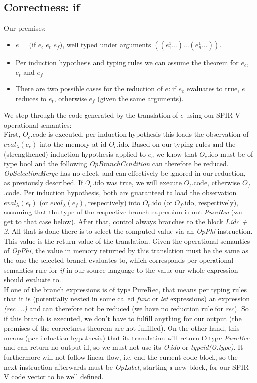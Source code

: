 \documentclass[letterpaper,12pt]{article}
\begin{document}
\subsection{Correctness: if}

Our premises:
\begin{itemize}
	\item $e$ = (if $e_c$ $e_t$ $e_f$), well typed under arguments
		$((e_1^1\dots)\dots(e_n^1\dots))$.
	\item Per induction hypothesis and typing rules we can assume the
		theorem for $e_c$, $e_t$ and $e_f$
	\item There are two possible cases for the reduction of $e$:
		if $e_c$ evaluates to true, $e$ reduces to $e_t$, otherwise 
		$e_f$ (given the same arguments).
\end{itemize}

We step through the code generated by the translation of $e$ using
our SPIR-V operational semantics: \\
First, $O_c$.code is executed, per induction hypothesis
this loads the observation of $eval_\lambda(e_c)$ into the memory
at id $O_c$.ido. Based on our typing rules and the (strengthened) induction hypothesis
applied to $e_c$ we know that $O_c$.ido must be of type bool and the
following \textit{OpBranchCondition} can therefore be reduced.
\textit{OpSelectionMerge} has no effect, and can effectively be ignored
in our reduction, as previously described.
If $O_c$.ido was true, we will execute $O_t$.code, otherwise
$O_f$.code. Per induction hypothesis, both are guaranteed to load
the observation $eval_\lambda(e_t)$ (or $eval_\lambda(e_f)$, respectively)
into $O_t$.ido (or $O_f$.ido, respectively), assuming that the type of the
respective branch expression is not \textit{PureRec} (we get to that case below).
After that, control always branches to the block \textit{I.idc + 2}.
All that is done there is to select the computed value via an \textit{OpPhi}
instruction. This value is the return value of the translation. Given
the operational semantics of \textit{OpPhi}, the value in memory
returned by this translation must be the same as the one the selected
branch evaluates to, which corresponds per operational semantics rule
for \textit{if} in our source language to the value our whole expression
should evaluate to. \\

If one of the branch expressions is of type PureRec, that means per
typing rules that it is (potentially nested in some called \textit{func}
or \textit{let} expressions) an expression \textit{(rec ...)}
and can therefore not be reduced (we have no reduction rule for \textit{rec}).
So if this branch is executed, we don't have to fulfill anything
for our output (the premises of the correctness theorem are not fulfilled).
On the other hand, this means (per induction hypothesis)
that its translation will return O.type \textit{PureRec} and can return
no output id, so we must not use its \textit{O.ido} or \textit{typeid(O.type)}.
It furthermore will not follow linear flow, i.e. end the current code block,
so the next instruction afterwards must be \textit{OpLabel}, starting
a new block, for our SPIR-V code vector to be well defined. \\
\end{document}

